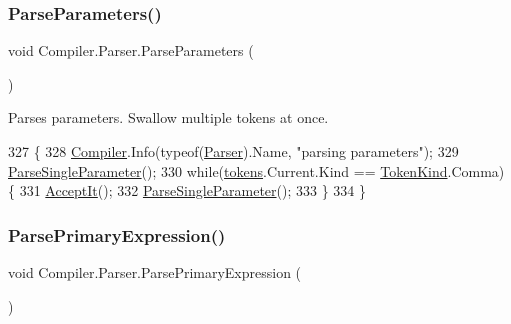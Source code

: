 \mbox{\label{class_compiler_1_1_parser_a80fd5f767a44bd3110cfbd4ee47a15dd}} 
\subsubsection{\texorpdfstring{Parse\+Parameters()}{ParseParameters()}}
{\footnotesize\ttfamily void Compiler.\+Parser.\+Parse\+Parameters (\begin{DoxyParamCaption}{ }\end{DoxyParamCaption})\hspace{0.3cm}{\ttfamily [protected]}}

Parses parameters. Swallow multiple tokens at once. 
\begin{DoxyCode}
327                                                       \{
328                         \mbox{\hyperlink{namespace_compiler}{Compiler}}.Info(typeof(\mbox{\hyperlink{class_compiler_1_1_parser_a450e11452db3f91ff866fc1e36ebc79d}{Parser}}).Name, \textcolor{stringliteral}{"parsing parameters"});
329                         \mbox{\hyperlink{class_compiler_1_1_parser_a8d8a8adab2a324a07947c147df0d250f}{ParseSingleParameter}}();
330                         \textcolor{keywordflow}{while}(\mbox{\hyperlink{class_compiler_1_1_parser_a4db075175c853a197c7b8db7d787a0a5}{tokens}}.Current.Kind == \mbox{\hyperlink{namespace_compiler_a57929962f25004759596fc3f13cf563c}{TokenKind}}.Comma) \{
331                             \mbox{\hyperlink{class_compiler_1_1_parser_ae19e507e1e2460cbad35b03d24402b4f}{AcceptIt}}();
332                             \mbox{\hyperlink{class_compiler_1_1_parser_a8d8a8adab2a324a07947c147df0d250f}{ParseSingleParameter}}();
333                         \}
334                     \}
\end{DoxyCode}
\mbox{\label{class_compiler_1_1_parser_a9ce17cf1f3fa7062daf05481f3230330}} 
\subsubsection{\texorpdfstring{Parse\+Primary\+Expression()}{ParsePrimaryExpression()}}
{\footnotesize\ttfamily void Compiler.\+Parser.\+Parse\+Primary\+Expression (\begin{DoxyParamCaption}{ }\end{DoxyParamCaption})\hspace{0.3cm}{\ttfamily [protected]}}

